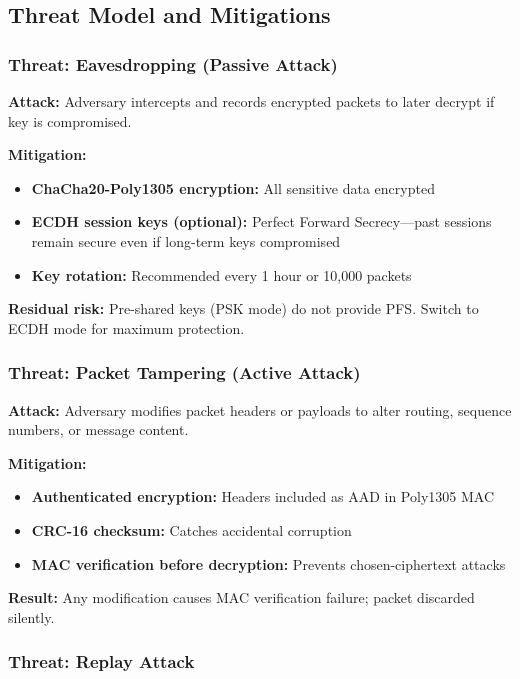 \documentclass[11pt,a4paper]{article}
\begin{document}
\subsection{Threat Model and Mitigations}

\subsubsection{Threat: Eavesdropping (Passive Attack)}

\textbf{Attack:} Adversary intercepts and records encrypted packets to later decrypt if key is compromised.

\textbf{Mitigation:}
\begin{itemize}[noitemsep]
    \item \textbf{ChaCha20-Poly1305 encryption:} All sensitive data encrypted
    \item \textbf{ECDH session keys (optional):} Perfect Forward Secrecy---past sessions remain secure even if long-term keys compromised
    \item \textbf{Key rotation:} Recommended every 1 hour or 10,000 packets
\end{itemize}

\textbf{Residual risk:} Pre-shared keys (PSK mode) do not provide PFS. Switch to ECDH mode for maximum protection.

\subsubsection{Threat: Packet Tampering (Active Attack)}

\textbf{Attack:} Adversary modifies packet headers or payloads to alter routing, sequence numbers, or message content.

\textbf{Mitigation:}
\begin{itemize}[noitemsep]
    \item \textbf{Authenticated encryption:} Headers included as AAD in Poly1305 MAC
    \item \textbf{CRC-16 checksum:} Catches accidental corruption
    \item \textbf{MAC verification before decryption:} Prevents chosen-ciphertext attacks
\end{itemize}

\textbf{Result:} Any modification causes MAC verification failure; packet discarded silently.

\subsubsection{Threat: Replay Attack}
\end{document}
